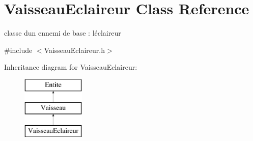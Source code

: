\hypertarget{class_vaisseau_eclaireur}{}\section{Vaisseau\+Eclaireur Class Reference}
\label{class_vaisseau_eclaireur}


classe d\textquotesingle{}un ennemi de base \+: l\textquotesingle{}éclaireur  




{\ttfamily \#include $<$Vaisseau\+Eclaireur.\+h$>$}

Inheritance diagram for Vaisseau\+Eclaireur\+:\begin{figure}[H]
\begin{center}
\leavevmode
\includegraphics[height=3.000000cm]{class_vaisseau_eclaireur}
\end{center}
\end{figure}
